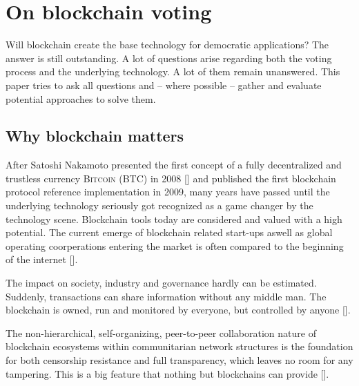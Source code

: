 
\section{On blockchain voting}
Will blockchain create the base technology for democratic applications? The answer is still outstanding. A lot of questions arise regarding both the voting process and the underlying technology. A lot of them remain unanswered. This paper tries to ask all questions and -- where possible -- gather and evaluate potential approaches to solve them.

\subsection{Why blockchain matters}
After Satoshi Nakamoto presented the first concept of a fully decentralized and trustless currency \textsc{Bitcoin (BTC)} in 2008 [\cite{NAKAMOTO2008}] and published the first blockchain protocol reference implementation in 2009, many years have passed until the underlying technology seriously got recognized as a game changer by the technology scene. Blockchain tools today are considered and valued with a high potential. The current emerge of blockchain related start-ups aswell as global operating coorperations entering the market is often compared to the beginning of the internet [\cite{EPIE2015}].\par
The impact on society, industry and governance hardly can be estimated. Suddenly, transactions can share information without any middle man. The blockchain is owned, run  and monitored by everyone, but controlled by anyone [\cite{EPIE2015}].\par
The non-hierarchical, self-organizing, peer-to-peer collaboration nature of blockchain ecosystems within communitarian network structures is the foundation for both censorship resistance and full transparency, which leaves no room for any tampering. This is a big feature that nothing but blockchains can provide [\cite{SCOTT2016, KAYE2016}].

